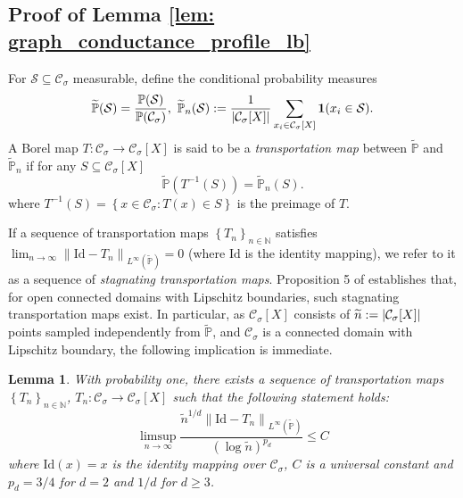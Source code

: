 \documentclass[11pt,twoside]{article}
\newtheorem{lemma}{Lemma}
\DeclarePairedDelimiter\abs{\lvert}{\rvert}
\newcommand{\set}[1]{\left\{#1\right\}}
\newcommand{\seq}[1]{\left\{#1\right\}_{n \in \mathbb{N}}}
\newcommand{\norm}[1]{\left\lVert#1\right\rVert}
\newcommand{\1}{\mathbf{1}}
\newcommand{\Xbf}{X}             %
\newcommand{\Pbb}{\mathbb{P}}
\newcommand{\Sset}{\mathcal{S}}
\newcommand{\Cset}{\mathcal{C}}
\newcommand{\Csig}{\Cset_{\sigma}}
\begin{document}
\subsection{Proof of Lemma \ref{lem: graph_conductance_profile_lb}}
\label{sec: proof_of_lemma_graph_conductance}

For $\Sset \subseteq \Csig$ measurable, define the conditional probability measures
\begin{equation*}
\widetilde{\Pbb}(\Sset) = \frac{\Pbb(\Sset)}{\Pbb(\Csig)}, ~ \widetilde{\Pbb}_{n}(\Sset) := \frac{1}{\abs{\Csig[\Xbf]}} \sum_{x_i \in \Csig[\Xbf]} \1(x_i \in \Sset).
\end{equation*} 
A Borel map $T: \Csig \to \Csig[\Xbf]$ is said to be a \emph{transportation map} between $\widetilde{\Pbb}$ and $\widetilde{\Pbb}_n$ if for any $S \subseteq \Csig[\Xbf]$
\begin{equation*}
\widetilde{\Pbb}(T^{-1}(S)) = \widetilde{\Pbb}_n(S).
\end{equation*}
where $T^{-1}(S) = \set{x \in \Csig: T(x) \in S}$ is the preimage of $T$. 

If a sequence of transportation maps $\seq{T_n}$ satisfies $\lim_{n \to \infty}\norm{\mathrm{Id} - T_n}_{L^{\infty}(\widetilde{\Pbb})} = 0$ (where $\mathrm{Id}$ is the identity mapping), we refer to it as a sequence of \emph{stagnating transportation maps}. Proposition 5 of \cite{garciatrillos16} establishes that, for open connected domains with Lipschitz boundaries, such stagnating transportation maps exist. In particular, as $\Csig[\Xbf]$ consists of $\widetilde{n} := \abs{\Csig[\Xbf]}$ points sampled independently from $\widetilde{\Pbb}$, and $\Csig$ is a connected domain with Lipschitz boundary, the following implication is immediate.

\begin{lemma}
	\label{lem: stagnating_transportation_maps}
	With probability one, there exists a sequence of transportation maps $\seq{T_n}$, $T_n: \Csig \to \Csig[\Xbf]$ such that the following statement holds:
	\begin{equation}
	\label{eqn: stagnating_transportation_maps}
	\limsup_{n \to \infty} \frac{\widetilde{n}^{1/d} \norm{\mathrm{Id} - T_n}_{L^{\infty}(\widetilde{\Pbb})}}{(\log \widetilde{n})^{p_d}} \leq C
	\end{equation}
	where $\mathrm{Id}(x) = x$ is the identity mapping over $\Csig$, $C$ is a universal constant and $p_d = 3/4$ for $d = 2$ and $1/d$ for $d \geq 3$.
\end{lemma}
\end{document}
